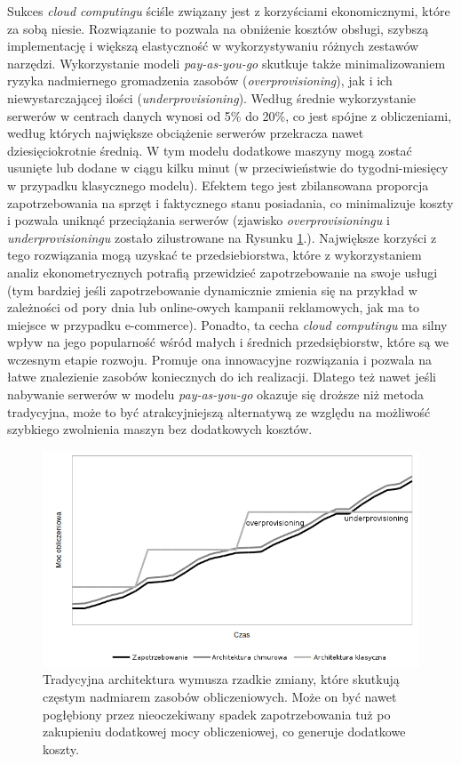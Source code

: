 \documentclass[12pt,a4paper,twoside]{article}
\begin{document}
Sukces \textit{cloud computingu} ściśle związany jest z korzyściami ekonomicznymi, które za sobą niesie. Rozwiązanie to pozwala na obniżenie kosztów obsługi, szybszą implementację i większą elastyczność w wykorzystywaniu różnych zestawów narzędzi. Wykorzystanie modeli \textit{pay-as-you-go} skutkuje także minimalizowaniem ryzyka nadmiernego gromadzenia zasobów (\textit{overprovisioning}), jak i ich niewystarczającej ilości (\textit{underprovisioning}). Według \citet{armburst2010} średnie wykorzystanie serwerów w centrach danych wynosi od 5\% do 20\%, co jest spójne z obliczeniami, według których największe obciążenie serwerów przekracza nawet dziesięciokrotnie średnią.  W tym modelu dodatkowe maszyny mogą zostać usunięte lub dodane w ciągu kilku minut (w przeciwieństwie do tygodni-miesięcy w przypadku klasycznego modelu). Efektem tego jest zbilansowana proporcja zapotrzebowania na sprzęt i faktycznego stanu posiadania, co minimalizuje koszty i pozwala uniknąć przeciążania serwerów (zjawisko \textit{overprovisioningu} i \textit{underprovisioningu} zostało zilustrowane na Rysunku \ref{fig:overp}.). Największe korzyści z tego rozwiązania mogą uzyskać te przedsiebiorstwa, które z wykorzystaniem analiz ekonometrycznych potrafią przewidzieć zapotrzebowanie na swoje usługi (tym bardziej jeśli zapotrzebowanie dynamicznie zmienia się na przykład w zależności od pory dnia lub online-owych kampanii reklamowych, jak ma to miejsce w przypadku e-commerce). Ponadto, ta cecha \textit{cloud computingu} ma silny wpływ na jego popularność wśród małych i średnich przedsiębiorstw, które są we wczesnym etapie rozwoju. Promuje ona innowacyjne rozwiązania i pozwala na łatwe znalezienie zasobów koniecznych do ich realizacji. Dlatego też nawet jeśli nabywanie serwerów w modelu \textit{pay-as-you-go} okazuje się droższe niż metoda tradycyjna, może to być atrakcyjniejszą alternatywą ze względu na możliwość szybkiego zwolnienia maszyn bez dodatkowych kosztów.

\begin{figure}[h]
  \centering
\includegraphics[scale=0.8]{../obrazy/fig:overp.png}
\caption{Tradycyjna architektura wymusza rzadkie zmiany, które skutkują częstym nadmiarem zasobów obliczeniowych. Może on być nawet pogłębiony przez nieoczekiwany spadek zapotrzebowania tuż po zakupieniu dodatkowej mocy obliczeniowej, co generuje dodatkowe koszty. \label{fig:overp}}
\end{figure}
\end{document}
